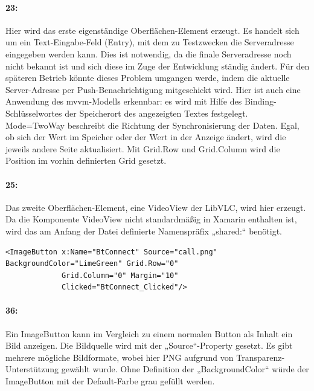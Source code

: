 \paragraph{23:} Hier wird das erste eigenständige Oberflächen-Element erzeugt. Es handelt sich um ein Text-Eingabe-Feld (Entry), mit dem zu Testzwecken die Serveradresse eingegeben werden kann. Dies ist notwendig, da die finale Serveradresse noch nicht bekannt ist und sich diese im Zuge der Entwicklung ständig ändert. Für den späteren Betrieb könnte dieses Problem umgangen werde, indem die aktuelle Server-Adresse per Push-Benachrichtigung mitgeschickt wird. Hier ist auch eine Anwendung des \ac{mvvm}-Modells erkennbar: es wird mit Hilfe des Binding-Schlüsselwortes der Speicherort des angezeigten Textes festgelegt. Mode=TwoWay beschreibt die Richtung der Synchronisierung der Daten. Egal, ob sich der Wert im Speicher oder der Wert in der Anzeige ändert, wird die jeweils andere Seite aktualisiert. Mit Grid.Row und Grid.Column wird die Position im vorhin definierten Grid gesetzt.
\paragraph{25:} Das zweite Oberflächen-Element, eine VideoView der LibVLC, wird hier erzeugt. Da die Komponente VideoView nicht standardmäßig in Xamarin enthalten ist, wird das am Anfang der Datei definierte Namenspräfix „shared:“ benötigt.

\begin{verbatim}
<ImageButton x:Name="BtConnect" Source="call.png" BackgroundColor="LimeGreen" Grid.Row="0"
             Grid.Column="0" Margin="10"
             Clicked="BtConnect_Clicked"/>
\end{verbatim}
\paragraph{36:} Ein ImageButton kann im Vergleich zu einem normalen Button als Inhalt ein Bild anzeigen. Die Bildquelle wird mit der „Source“-Property gesetzt. Es gibt mehrere mögliche Bildformate, wobei hier PNG aufgrund von Transparenz-Unterstützung gewählt wurde. Ohne Definition der „BackgroundColor“ würde der ImageButton mit der Default-Farbe grau gefüllt werden.
